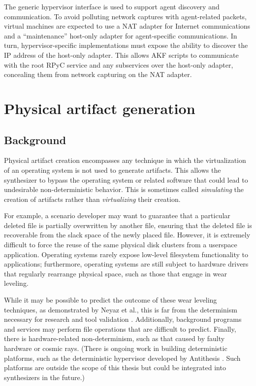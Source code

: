 \documentclass[letterpaper,12pt]{report}
\begin{document}
The generic hypervisor interface is used to support agent discovery and
communication. To avoid polluting network captures with agent-related
packets, virtual machines are expected to use a NAT adapter for Internet
communications and a ``maintenance'' host-only adapter for
agent-specific communications. In turn, hypervisor-specific
implementations must expose the ability to discover the IP address of
the host-only adapter. This allows AKF scripts to communicate with the
root RPyC service and any subservices over the host-only adapter,
concealing them from network capturing on the NAT adapter.

\section{Physical artifact
generation}\label{physical-artifact-generation}

\subsection{Background}\label{background}

Physical artifact creation encompasses any technique in which the
virtualization of an operating system is not used to generate artifacts.
This allows the synthesizer to bypass the operating system or related
software that could lead to undesirable non-deterministic behavior. This
is sometimes called \emph{simulating} the creation of artifacts rather
than \emph{virtualizing} their creation.

For example, a scenario developer may want to guarantee that a
particular deleted file is partially overwritten by another file,
ensuring that the deleted file is recoverable from the slack space of
the newly placed file. However, it is extremely difficult to force the
reuse of the same physical disk clusters from a userspace application.
Operating systems rarely expose low-level filesystem functionality to
applications; furthermore, operating systems are still subject to
hardware drivers that regularly rearrange physical space, such as those
that engage in wear leveling.

While it may be possible to predict the outcome of these wear leveling
techniques, as demonstrated by Neyaz et al., this is far from the
determinism necessary for research and tool validation
\cite{neyazForensicAnalysisWear2018}. Additionally, background
programs and services may perform file operations that are difficult to
predict. Finally, there is hardware-related non-determinism, such as
that caused by faulty hardware or cosmic rays. (There is ongoing work in
building deterministic platforms, such as the deterministic hypervisor
developed by Antithesis \cite{pshenichkinYouThinkYou2024}. Such
platforms are outside the scope of this thesis but could be integrated
into synthesizers in the future.)
\end{document}

